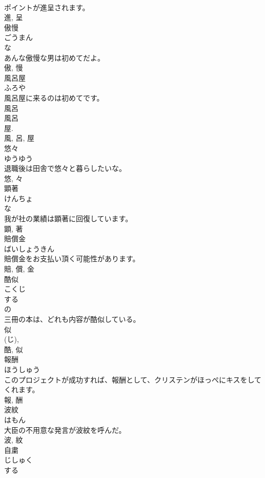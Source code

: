 \documentclass[8pt]{extreport}
\begin{document}
\begin{CJK}{UTF8}{min}
\\	ポイントが進呈されます。	
\\	進, 呈	
\\	傲慢	
\\	ごうまん	
\\	な 
\\	あんな傲慢な男は初めてだよ。	
\\	傲, 慢	
\\	風呂屋	
\\	ふろや	
\\	風呂屋に来るのは初めてです。	
\\	風呂 
\\	風呂 
\\	屋. 
\\	風, 呂, 屋	
\\	悠々	
\\	ゆうゆう	
\\	退職後は田舎で悠々と暮らしたいな。	
\\	悠, 々	
\\	顕著	
\\	けんちょ	
\\	な 
\\	我が社の業績は顕著に回復しています。	
\\	顕, 著	
\\	賠償金	
\\	ばいしょうきん	
\\	賠償金をお支払い頂く可能性があります。	
\\	賠, 償, 金	
\\	酷似	
\\	こくじ	
\\	する 
\\	の 
\\	三冊の本は、どれも内容が酷似している。	
\\	似 
\\	(じ), 
\\	酷, 似	
\\	報酬	
\\	ほうしゅう	
\\	このプロジェクトが成功すれば、報酬として、クリステンがほっぺにキスをしてくれます。	
\\	報, 酬	
\\	波紋	
\\	はもん	
\\	大臣の不用意な発言が波紋を呼んだ。	
\\	波, 紋	
\\	自粛	
\\	じしゅく	
\\	する 

\end{CJK}
\end{document}
